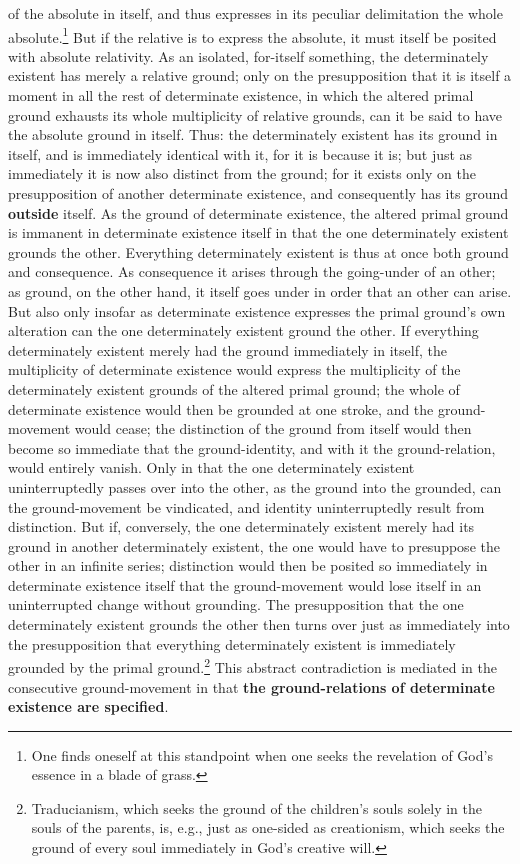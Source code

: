\documentclass[12pt,a4paper,openany]{book}
\newcommand{\opage}[1]{\marginnote{\footnotesize\textit{[#1]}}}
\begin{document}
of the absolute in itself, and thus expresses in its
peculiar delimitation the whole absolute.\footnote{One finds oneself at this standpoint when one seeks the revelation of God's essence in a blade of grass.} But if the relative is to express the absolute,
it must itself be posited with absolute relativity. As an isolated,
for-itself something, the determinately existent has merely a
relative ground; only on the presupposition that it
is itself a moment in all the rest of determinate existence, in which
the altered primal ground exhausts its whole
\setcounter{footnote}{0}%
\opage{134}multiplicity of relative grounds, can it be said to have the absolute
ground in itself. Thus: the determinately existent has its
ground in itself, and is immediately identical with it, for it
is because it is; but just as immediately it is now
also distinct from the ground; for it exists only on
the presupposition of another determinate existence, and consequently
has its ground \textbf{outside} itself. As the ground of
determinate existence, the altered primal ground is immanent in determinate existence
itself in that the one determinately existent grounds
the other. Everything determinately existent is thus at once
both ground and consequence. As consequence it arises
through the going-under of an other; as ground, on the other hand, it
itself goes under in order that an other can arise. But
also only insofar as determinate existence expresses the primal ground's
own alteration can the one determinately existent ground the
other. If everything determinately existent merely had the ground
immediately in itself, the multiplicity of determinate existence would
express the multiplicity of the determinately existent grounds of the altered primal ground;
the whole of determinate existence would then be
grounded at one stroke, and the ground-movement would cease;
the distinction of the ground from itself would then become so immediate
that the ground-identity, and with it the ground-relation, would entirely
vanish. Only in that the one determinately existent
uninterruptedly passes over into the other, as the ground into the
grounded, can the ground-movement be vindicated, and identity
uninterruptedly result from distinction. But if, conversely,
the one determinately existent merely had its ground in another
determinately existent, the one would have to presuppose the
other in an infinite series; distinction would then be
posited so immediately in determinate existence itself that the ground-movement
would lose itself in an uninterrupted change without grounding.
The presupposition that the one determinately existent
grounds the other then turns over just as immediately
into the presupposition that everything determinately existent is immediately
\setcounter{footnote}{0}%
\opage{135}grounded by the primal ground.\footnote{Traducianism, which seeks the ground of the children's souls solely in the souls of the parents, is, e.g., just as one-sided as creationism, which seeks the ground of every soul immediately in God's creative will.} This abstract contradiction
is mediated in the consecutive ground-movement in that
\textbf{the ground-relations of determinate existence are specified}.
\end{document}
